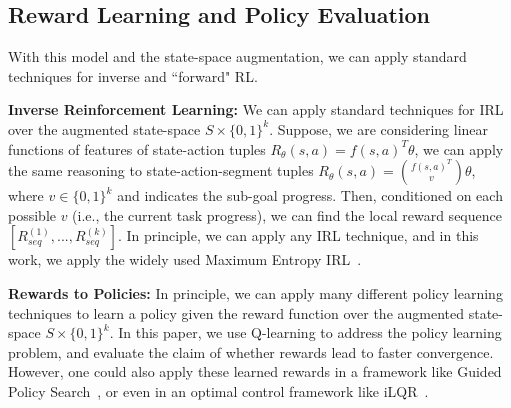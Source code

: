 \subsection{Reward Learning and Policy Evaluation}
With this model and the state-space augmentation, we can apply standard techniques for inverse and ``forward" RL.

\vspace{0.5em} \noindent \textbf{Inverse Reinforcement Learning: } We can apply standard techniques for IRL over the augmented state-space $S \times  \{0,1\}^k$. Suppose, we are considering linear functions of features of state-action tuples $R_{\theta}(s,a) = f(s,a)^T\theta$, we can apply the same reasoning to state-action-segment tuples $R_{\theta}(s,a) = \binom{f(s,a)^T}{v}\theta$, where $v \in \{0,1\}^k$ and indicates the sub-goal progress. Then, conditioned on each possible $v$ (i.e., the current task progress), we can find the local reward sequence $[R^{(1)}_{seq},...,R^{(k)}_{seq}]$. 
In principle, we can apply any IRL technique, and in this work, we apply the widely used Maximum Entropy IRL~\cite{DBLP:conf/aaai/ZiebartMBD08}.

\vspace{0.5em} \noindent \textbf{Rewards to Policies: }
In principle, we can apply many different policy learning techniques to learn a policy given the reward function over the augmented state-space $S \times  \{0,1\}^k$. In this paper, we use Q-learning to address the policy learning problem, and evaluate the claim of whether \hirl rewards lead to faster convergence. However, one could also apply these learned rewards in a framework like Guided Policy Search~\cite{DBLP:journals/corr/LevineFDA15}, or even in an optimal control framework like iLQR~\cite{li2004iterative}.








